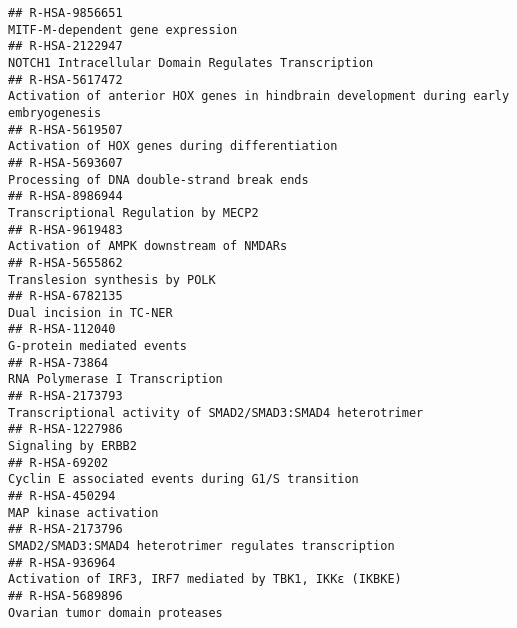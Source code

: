 \documentclass[
]{article}
\begin{document}
\begin{verbatim}
## R-HSA-9856651                                                                                                     MITF-M-dependent gene expression
## R-HSA-2122947                                                                                  NOTCH1 Intracellular Domain Regulates Transcription
## R-HSA-5617472                                                 Activation of anterior HOX genes in hindbrain development during early embryogenesis
## R-HSA-5619507                                                                                       Activation of HOX genes during differentiation
## R-HSA-5693607                                                                                           Processing of DNA double-strand break ends
## R-HSA-8986944                                                                                                  Transcriptional Regulation by MECP2
## R-HSA-9619483                                                                                              Activation of AMPK downstream of NMDARs
## R-HSA-5655862                                                                                                        Translesion synthesis by POLK
## R-HSA-6782135                                                                                                              Dual incision in TC-NER
## R-HSA-112040                                                                                                             G-protein mediated events
## R-HSA-73864                                                                                                         RNA Polymerase I Transcription
## R-HSA-2173793                                                                           Transcriptional activity of SMAD2/SMAD3:SMAD4 heterotrimer
## R-HSA-1227986                                                                                                                   Signaling by ERBB2
## R-HSA-69202                                                                                     Cyclin E associated events during G1/S transition 
## R-HSA-450294                                                                                                                 MAP kinase activation
## R-HSA-2173796                                                                               SMAD2/SMAD3:SMAD4 heterotrimer regulates transcription
## R-HSA-936964                                                                               Activation of IRF3, IRF7 mediated by TBK1, IKKε (IKBKE)
## R-HSA-5689896                                                                                                       Ovarian tumor domain proteases

\end{verbatim}
\end{document}
